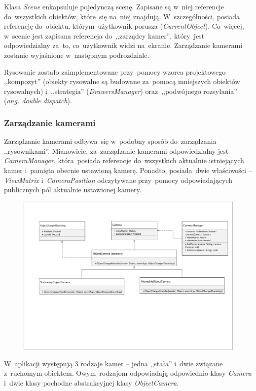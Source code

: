 \documentclass[11pt, a4paper, oneside]{scrartcl}
\begin{document}
Klasa \textit{Scene} enkapsuluje pojedynczą scenę. Zapisane są w~niej referencje do~wszystkich obiektów, które~się na~niej znajdują.
W~szczególności, posiada referencję do~obiektu, którym~użytkownik porusza (\textit{CurrentObject}).
Co~więcej, w~scenie jest zapisana referencja do~,,zarządcy kamer'', który~jest odpowiedzialny za~to, co~użytkownik widzi na~ekranie.
Zarządzanie kamerami zostanie wyjaśnione w~następnym podrozdziale.

Rysowanie zostało zaimplementowane przy~pomocy wzorca projektowego ,,kompozyt'' (obiekty rysowalne są budowane za~pomocą mniejszych
obiektów rysowalnych) i~,,strategia'' (\textit{DrawersManager}) oraz~,,podwójnego rozsyłania'' (\textit{ang. double dispatch}).

\subsubsection{Zarządzanie kamerami}
Zarządzanie kamerami odbywa~się w~podobny sposób do~zarządzania ,,rysownikami''. Mianowicie, za~zarządzanie kamerami odpowiedzialny jest \textit{CameraManager}, która~posiada referencje do~wszystkich aktualnie istniejących kamer i~pamięta obecnie ustawioną kamerę. 
Ponadto, posiada~dwie właściwości -- \textit{ViewMatrix} i~\textit{CameraPosition} odczytywane przy~pomocy odpowiadających publicznych pól aktualnie
ustawionej kamery.  \\ 
\begin{figure}[H]
	\centering 
	\includegraphics[scale=0.6]{Cameras.pdf}
\end{figure}

W~aplikacji występują 3 rodzaje kamer -- jedna ,,stała'' i~dwie związane z~ruchomym obiektem. Owym~rodzajom odpowiadają odpowiednio klasy
\textit{Camera} i~dwie klasy pochodne abstrakcyjnej klasy \textit{ObjectCamera}.
\end{document}

